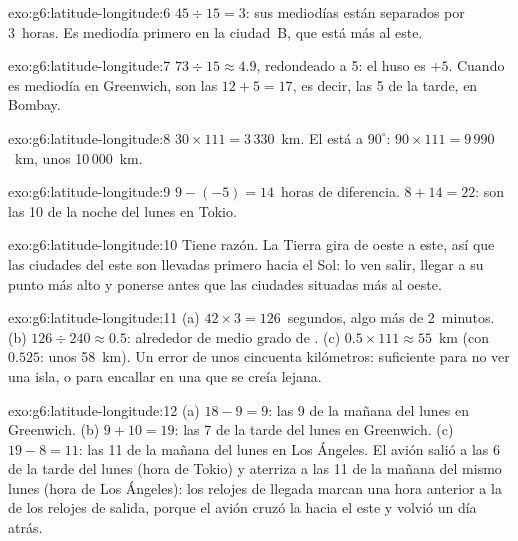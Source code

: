 \begin{solution}{exo:g6:latitude-longitude:6}
$45 \div 15 = 3$: sus mediodías están separados por 3~horas. Es mediodía
primero en la ciudad~B, que está más al este.
\end{solution}

\begin{solution}{exo:g6:latitude-longitude:7}
$73 \div 15 \approx 4.9$, redondeado a 5: el huso es $+5$. Cuando es
mediodía en Greenwich, son las $12 + 5 = 17$, es decir, las 5 de la tarde,
en Bombay.
\end{solution}

\begin{solution}{exo:g6:latitude-longitude:8}
$30 \times 111 = 3\,330$~km. El  está a $90^\circ$:
$90 \times 111 = 9\,990$~km, unos 10\,000~km.
\end{solution}

\begin{solution}{exo:g6:latitude-longitude:9}
$9 - (-5) = 14$~horas de diferencia. $8 + 14 = 22$: son las 10 de la noche
del lunes en Tokio.
\end{solution}

\begin{solution}{exo:g6:latitude-longitude:10}
Tiene razón. La Tierra gira de oeste a este, así que las ciudades del este
son llevadas primero hacia el Sol: lo ven salir, llegar a su punto más alto
y ponerse antes que las ciudades situadas más al oeste.
\end{solution}

\begin{solution}{exo:g6:latitude-longitude:11}
(a) $42 \times 3 = 126$~segundos, algo más de 2~minutos. (b)
$126 \div 240 \approx 0.5$: alrededor de medio grado de . (c)
$0.5 \times 111 \approx 55$~km (con $0.525$: unos 58~km). Un error de unos
cincuenta kilómetros: suficiente para no ver una isla, o para encallar en
una  que se creía lejana.
\end{solution}

\begin{solution}{exo:g6:latitude-longitude:12}
(a) $18 - 9 = 9$: las 9 de la mañana del lunes en Greenwich. (b)
$9 + 10 = 19$: las 7 de la tarde del lunes en Greenwich. (c) $19 - 8 = 11$:
las 11 de la mañana del lunes en Los Ángeles. El avión salió a las 6 de la
tarde del lunes (hora de Tokio) y aterriza a las 11 de la mañana del mismo
lunes (hora de Los Ángeles): los relojes de llegada marcan una hora anterior
a la de los relojes de salida, porque el avión cruzó la  hacia el este y volvió un día atrás.
\end{solution}

